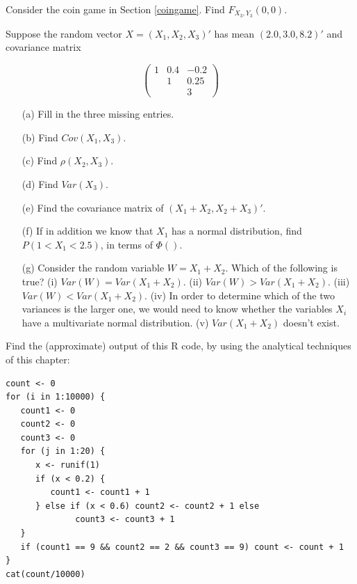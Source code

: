 \oneproblem
Consider the coin game in Section \ref{coingame}.  Find
$F_{X_3,Y_3}(0,0)$.

\oneproblem
 Suppose the random vector $X = (X_1,X_2,X_3)'$ has mean
$(2.0,3.0,8.2)'$ and covariance matrix

\begin{equation}
   \left (
   \begin{array}{ccc}
   1 & 0.4 & -0.2\\
   \  & 1 &  0.25 \\
   \  & \  & 3
   \end{array}
   \right )
\end{equation}

\begin{itemize}

\item [(a)] Fill in the three missing entries.

\item [(b)] Find $Cov(X_1,X_3)$.

\item [(c)] Find $\rho(X_2,X_3)$.

\item [(d)] Find $Var(X_3)$.

\item [(e)] Find the covariance matrix of $(X_1+X_2,X_2+X_3)'$.

\item [(f)] If in addition we know that $X_1$ has a normal
distribution, find $P(1 < X_1 < 2.5)$, in terms of $\Phi()$.

\item [(g)] Consider the random variable $W = X_1 + X_2$.  Which of
the following is true?
(i) $Var(W) = Var(X_1+X_2)$.
(ii) $Var(W) > Var(X_1+X_2)$.
(iii) $Var(W) < Var(X_1+X_2)$.
(iv) In order to determine which of the two variances is the larger one,
we would need to know whether the variables $X_i$ have a multivariate
normal distribution.
(v) $Var(X_1+X_2)$ doesn't exist.

\end{itemize}

\oneproblem
Find the (approximate) output of this R code, by using the analytical
techniques of this chapter:

\begin{Verbatim}[fontsize=\relsize{-2}]
count <- 0
for (i in 1:10000) {
   count1 <- 0
   count2 <- 0
   count3 <- 0
   for (j in 1:20) {
      x <- runif(1)
      if (x < 0.2) {
         count1 <- count1 + 1
      } else if (x < 0.6) count2 <- count2 + 1 else
              count3 <- count3 + 1
   }
   if (count1 == 9 && count2 == 2 && count3 == 9) count <- count + 1
}
cat(count/10000)
\end{Verbatim}

